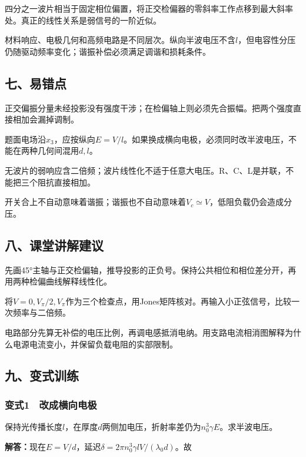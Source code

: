 \documentclass[12pt,a4paper,fontset=fandol]{ctexart}
\begin{document}
四分之一波片相当于固定相位偏置，将正交检偏器的零斜率工作点移到最大斜率处。真正的线性关系是弱信号的一阶近似。

材料响应、电极几何和高频电路是不同层次。纵向半波电压不含\(l\)，但电容性分压仍随驱动频率变化；谐振补偿必须满足调谐和损耗条件。

\subsection{七、易错点}\label{ux4e03ux6613ux9519ux70b9-7}

正交偏振分量未经投影没有强度干涉；在检偏轴上则必须先合振幅。把两个强度直接相加会漏掉调制。

题面电场沿\(x_3\)，应按纵向\(E=V/l\)。如果换成横向电极，必须同时改半波电压，不能在两种几何间混用\(d,l\)。

无波片的弱响应含二倍频；波片线性化不适于任意大电压。R、C、L是并联，不能把三个阻抗直接相加。

开关合上不自动意味着谐振；谐振也不自动意味着\(V_c\simeq V\)，低阻负载仍会造成分压。

\subsection{八、课堂讲解建议}\label{ux516bux8bfeux5802ux8bb2ux89e3ux5efaux8bae-7}

先画45°主轴与正交检偏轴，推导投影的正负号。保持公共相位和相位差分开，再用两种检偏曲线解释线性化。

将\(V=0,V_\pi/2,V_\pi\)作为三个检查点，用Jones矩阵核对。再输入小正弦信号，比较一次频率与二倍频。

电路部分先算无补偿的电压比例，再调电感抵消电纳。用支路电流相消图解释为什么电源电流变小，并保留负载电阻的实部限制。

\subsection{九、变式训练}\label{ux4e5dux53d8ux5f0fux8badux7ec3-7}

\subsubsection{变式1　改成横向电极}\label{ux53d8ux5f0f1-ux6539ux6210ux6a2aux5411ux7535ux6781}

保持光传播长度\(l\)，在厚度\(d\)两侧加电压，折射率差仍为\(n_0^3\gamma E\)。求半波电压。

\textbf{解答：}现在\(E=V/d\)，延迟\(\delta=2\pi n_0^3\gamma lV/(\lambda_0d)\)。故
\end{document}
